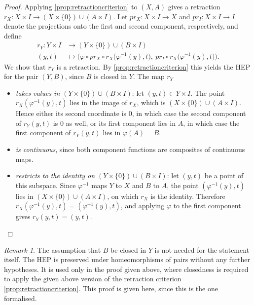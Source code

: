 \documentclass[11pt, a4paper, english]{article}
\theoremstyle{plain}
\theoremstyle{definition}
\theoremstyle{remark}
\newtheorem{remark}[theorem]{Remark}
\numberwithin{equation}{section}
\numberwithin{theorem}{section}
\begin{document}
\begin{proof}
    Applying \cref{prop:retractioncriterion} to $(X,A)$ gives a retraction $r_X \colon X \times I \to (X \times \{0\}) \cup (A \times I)$. Let $pr_X \colon X \times I \to X$ and $pr_I \colon X \times I \to I$ denote the projections onto the first and second component, respectively, and define 
    \begin{align*}
        r_Y \colon Y \times I &\longrightarrow (Y \times \{0\}) \cup (B \times I) \\
        (y,t) &\longmapsto
        \Big(\varphi \circ pr_X \circ r_X\big(\varphi^{-1}(y), t\big),\
        pr_I \circ r_X\big(\varphi^{-1}(y), t\big)\Big) .
    \end{align*}
    We show that $r_Y$ is a retraction. By \cref{prop:retractioncriterion} this  yields the HEP for the pair $(Y,B)$, since $B$ is closed in $Y$. The map $r_Y$
    \begin{itemize}
    \item \emph{takes values in $(Y \times \{0\}) \cup (B \times I)$}: let $(y,t) \in Y \times I$. The point $r_X(\varphi^{-1}(y),t)$ lies in the image of $r_X$, which is $(X \times \{0\}) \cup (A \times I)$. Hence either its second coordinate is $0$, in which case the second component of $r_Y(y,t)$ is $0$ as well, or its first component lies in $A$, in which case the first component of $r_Y(y,t)$ lies in $\varphi(A) = B$.
    \item \emph{is continuous}, since both component functions are composites of continuous maps.
    \item \emph{restricts to the identity on $(Y \times \{0\}) \cup (B \times I)$}: let $(y,t)$ be a point of this subspace. Since $\varphi^{-1}$ maps $Y$ to $X$ and $B$ to $A$, the point $(\varphi^{-1}(y),t)$ lies in $(X \times \{0\}) \cup (A \times I)$, on which $r_X$ is the identity. Therefore $r_X(\varphi^{-1}(y),t) = (\varphi^{-1}(y),t)$, and applying $\varphi$ to the first component gives $r_Y(y,t) = (y,t)$.
    \end{itemize}
\end{proof}

\begin{remark}
The assumption that $B$ be closed in $Y$ is not needed for the statement itself. The HEP is preserved under homeomorphisms of pairs without any further hypotheses. It is used only in the proof given above, where closedness is required to apply the given above version of the retraction criterion \cref{prop:retractioncriterion}. This proof is given here, since this is the one formalised.
\end{remark}
\end{document}
